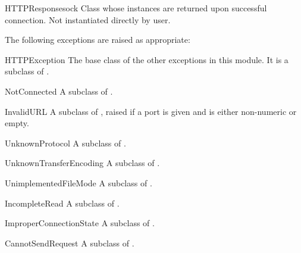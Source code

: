 \begin{classdesc}{HTTPResponse}{sock}
Class whose instances are returned upon successful connection.  Not
instantiated directly by user.
\end{classdesc}

The following exceptions are raised as appropriate:

\begin{excdesc}{HTTPException}
The base class of the other exceptions in this module.  It is a
subclass of .
\end{excdesc}

\begin{excdesc}{NotConnected}
A subclass of .
\end{excdesc}

\begin{excdesc}{InvalidURL}
A subclass of , raised if a port is given and is
either non-numeric or empty.
\end{excdesc}

\begin{excdesc}{UnknownProtocol}
A subclass of .
\end{excdesc}

\begin{excdesc}{UnknownTransferEncoding}
A subclass of .
\end{excdesc}

\begin{excdesc}{UnimplementedFileMode}
A subclass of .
\end{excdesc}

\begin{excdesc}{IncompleteRead}
A subclass of .
\end{excdesc}

\begin{excdesc}{ImproperConnectionState}
A subclass of .
\end{excdesc}

\begin{excdesc}{CannotSendRequest}
A subclass of .
\end{excdesc}


